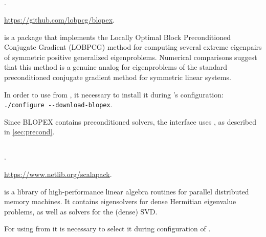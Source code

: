 \subsection*{\underline{\blopex}}
\begin{description}
\setlength{\itemsep}{0pt}
\item[References.]\citep{Knyazev:2007:BLO}.
\item[Website.] \url{https://github.com/lobpcg/blopex}.
\item[Summary.] \blopex is a package that implements the Locally Optimal Block Preconditioned Conjugate Gradient (LOBPCG) method for computing several extreme eigenpairs of symmetric positive generalized eigenproblems. Numerical comparisons suggest that this method is a genuine analog for eigenproblems of the standard preconditioned conjugate gradient method for symmetric linear systems.
\item[Installation.] In order to use \blopex from \slepc, it necessary to install it during \slepc's configuration: \Verb!./configure --download-blopex!.
\item[Specific options.] Since BLOPEX contains preconditioned solvers, the \slepc interface uses , as described in \ref{sec:precond}.
\end{description}

\subsection*{\underline{\scalapack}}
\begin{description}
\setlength{\itemsep}{0pt}
\item[References.]\citep{Blackford:1997:SUG}.
\item[Website.] \url{https://www.netlib.org/scalapack}.
\item[Summary.] \scalapack is a library of high-performance linear algebra routines for parallel distributed memory machines. It contains eigensolvers for dense Hermitian eigenvalue problems, as well as solvers for the (dense) SVD.
\item[Installation.] For using \scalapack from \slepc it is necessary to select it during configuration of \petsc.
\end{description}

